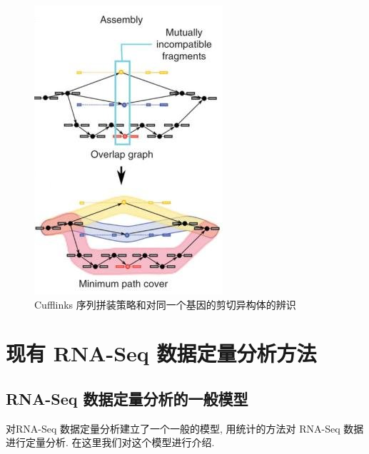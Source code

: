 \begin{figure}[!t]
\centering
\includegraphics[height=0.5\textheight]{figures/cufflinks-assembly.jpg}
\caption{Cufflinks 序列拼装策略和对同一个基因的剪切异构体的辨识 \cite{cufflinks.2010}}
\label{intro-cufflinks-assembly}
\end{figure}

\section{现有 RNA-Seq 数据定量分析方法}

\subsection{RNA-Seq 数据定量分析的一般模型}
\label{rna-seq-general-model}

 对RNA-Seq 数据定量分析建立了一个一般的模型, 
用统计的方法对 RNA-Seq 数据进行定量分析. 在这里我们对这个模型进行介绍. 


